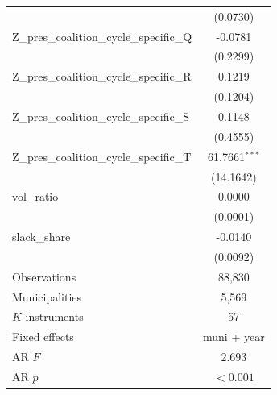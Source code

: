 \begin{tabular}{lc}
 & (0.0730) \\
Z\_pres\_coalition\_cycle\_specific\_Q & -0.0781 \\
 & (0.2299) \\
Z\_pres\_coalition\_cycle\_specific\_R & 0.1219 \\
 & (0.1204) \\
Z\_pres\_coalition\_cycle\_specific\_S & 0.1148 \\
 & (0.4555) \\
Z\_pres\_coalition\_cycle\_specific\_T & 61.7661$^{***}$ \\
 & (14.1642) \\
vol\_ratio & 0.0000 \\
 & (0.0001) \\
slack\_share & -0.0140 \\
 & (0.0092) \\
\midrule
Observations & 88,830 \\
Municipalities & 5,569 \\
$K$ instruments & 57 \\
Fixed effects & muni + year \\
AR $F$ & 2.693 \\
AR $p$ & $<0.001$ \\
\bottomrule
\end{tabular}
